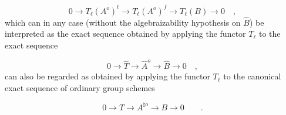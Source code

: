 \begin{equation}\tag{7.3.6}
0 \longrightarrow T_{\ell}(A^{o})^{t}
 \longrightarrow T_{\ell}(A^{o})^{f}
 \longrightarrow T_{\ell}(B) \longrightarrow 0 \quad ,
\end{equation}
which can in any case (without the algebraizability hypothesis on
$\widehat B$) be interpreted as the exact sequence obtained by
applying the functor $T_{\ell}$ to the exact sequence

\begin{equation*}
0 \longrightarrow \widehat{T} \longrightarrow \widehat{A}^{o}
 \longrightarrow \widehat{B} \longrightarrow 0 \quad ,
\end{equation*}
can also be regarded as obtained by applying the functor $T_{\ell}$
to the canonical exact sequence of ordinary group schemes

\begin{equation*}
0 \longrightarrow T \longrightarrow A^{\natural o}
 \longrightarrow B \longrightarrow 0 \qquad .
\end{equation*}
